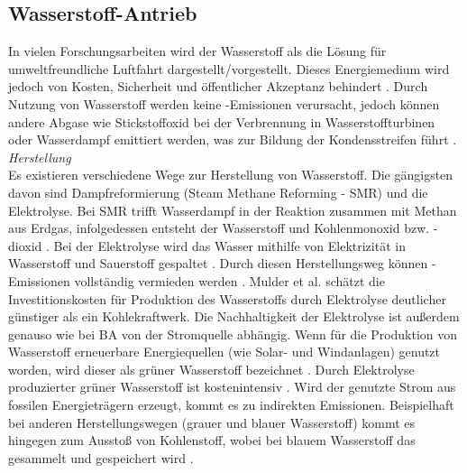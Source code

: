 \subsection{Wasserstoff-Antrieb}
\label{ss:Wasserstoff-Antrieb}

In vielen Forschungsarbeiten wird der Wasserstoff als die Lösung für umweltfreundliche Luftfahrt dargestellt/vorgestellt.
Dieses Energiemedium wird jedoch von Kosten, Sicherheit und öffentlicher Akzeptanz behindert \cite{ansell2023review}.
Durch Nutzung von Wasserstoff werden keine -Emissionen verursacht, jedoch können andere Abgase 
wie Stickstoffoxid  bei der Verbrennung in Wasserstoffturbinen oder Wasserdampf emittiert werden, was zur Bildung der Kondensstreifen
führt \cite{hepperle2012electric}.\\
%
\textit{Herstellung}\\
Es existieren verschiedene Wege zur Herstellung von Wasserstoff. 
Die gängigsten davon sind Dampfreformierung (Steam Methane Reforming - SMR) und die Elektrolyse. %
Bei SMR trifft Wasserdampf in der Reaktion zusammen mit Methan aus Erdgas, infolgedessen entsteht der
Wasserstoff  und Kohlenmonoxid  bzw. -dioxid \cite{mulder2019outlook}. Bei der Elektrolyse wird das Wasser mithilfe von Elektrizität 
in Wasserstoff  und Sauerstoff  gespaltet \cite{mulder2019outlook}. Durch diesen Herstellungsweg können -Emissionen 
vollständig vermieden werden \cite{dalmia2022powering}. 
Mulder et al. \cite{mulder2019outlook} schätzt die Investitionskosten für Produktion des Wasserstoffs durch Elektrolyse deutlicher günstiger als ein Kohlekraftwerk.
Die Nachhaltigkeit der Elektrolyse ist außerdem genauso wie bei BA von der Stromquelle abhängig.
%
Wenn für die Produktion von Wasserstoff erneuerbare Energiequellen (wie Solar- und Windanlagen) genutzt worden, 
wird dieser als grüner Wasserstoff bezeichnet \cite{mulder2019outlook}. 
Durch Elektrolyse produzierter grüner Wasserstoff ist kostenintensiv \cite{dalmia2022powering}.
Wird der genutzte Strom aus fossilen Energieträgern erzeugt, kommt es zu indirekten Emissionen.
Beispielhaft bei anderen Herstellungswegen (grauer und blauer Wasserstoff)
kommt es hingegen zum Ausstoß von Kohlenstoff, wobei bei blauem Wasserstoff das  gesammelt und gespeichert wird \cite{mulder2019outlook}.

